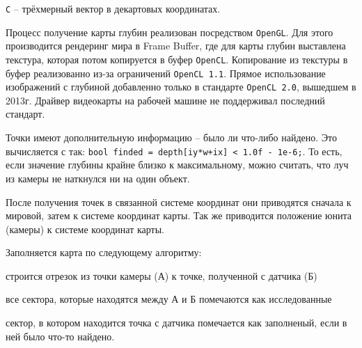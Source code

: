 \verb|C| -- трёхмерный вектор в декартовых координатах.

Процесс получение карты глубин реализован посредством \verb|OpenGL|. Для этого 
производится рендеринг мира в Frame Buffer, где для карты глубин выставлена
текстура, которая потом копируется в буфер \verb|OpenCL|.
Копирование из текстуры в буфер реализованно из-за ограничений
\verb|OpenCL 1.1|. Прямое использование изображений с глубиной добавленно
только в стандарте \verb|OpenCL 2.0|, вышедшем в 2013г.
Драйвер видеокарты на рабочей машине не поддерживал последний стандарт.

Точки имеют дополнительную информацию -- было ли что-либо найдено.
Это вычисляется с так: \verb|bool finded = depth[iy*w+ix] < 1.0f - 1e-6;|.
То есть, если значение глубины крайне близко к максимальному, можно считать, что
луч из камеры не наткнулся ни на один объект.

После получения точек в связанной системе координат они приводятся
сначала к мировой, затем к системе координат карты.
Так же приводится положение юнита (камеры) к системе координат карты.

Заполняется карта по следующему алгоритму:
\begin{mintemize}
    \item строится отрезок из точки камеры (А) к точке, полученной с датчика (Б)
    \item все сектора, которые находятся между А и Б помечаются как исследованные
    \item сектор, в котором находится точка с датчика помечается как заполненый,
        если в ней было что-то найдено.
\end{mintemize}
